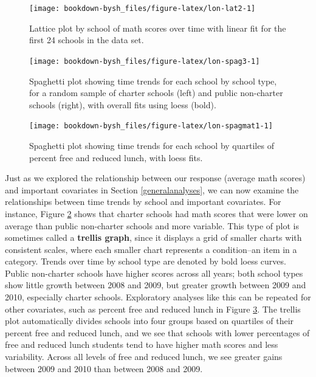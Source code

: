 \documentclass[
]{krantz}
\begin{document}
\begin{figure}

{\centering \texttt{[image: bookdown-bysh\_files/figure-latex/lon-lat2-1]} 

}

\caption{ Lattice plot by school of math scores over time with linear fit for the first 24 schools in the data set.}\label{fig:lon-lat2}
\end{figure}

\begin{figure}

{\centering \texttt{[image: bookdown-bysh\_files/figure-latex/lon-spag3-1]} 

}

\caption{Spaghetti plot showing time trends for each school by school type, for a random sample of charter schools (left) and public non-charter schools (right), with overall fits using loess (bold).}\label{fig:lon-spag3}
\end{figure}

\begin{figure}

{\centering \texttt{[image: bookdown-bysh\_files/figure-latex/lon-spagmat1-1]} 

}

\caption{Spaghetti plot showing time trends for each school by quartiles of percent free and reduced lunch, with loess fits.}\label{fig:lon-spagmat1}
\end{figure}

Just as we explored the relationship between our response (average math scores) and important covariates in Section \ref{generalanalyses}, we can now examine the relationships between time trends by school and important covariates. For instance, Figure \ref{fig:lon-spag3} shows that charter schools had math scores that were lower on average than public non-charter schools and more variable. This type of plot is sometimes called a \textbf{trellis graph}, since it displays a grid of smaller charts with consistent scales, where each smaller chart represents a condition--an item in a category. Trends over time by school type are denoted by bold loess curves. Public non-charter schools have higher scores across all years; both school types show little growth between 2008 and 2009, but greater growth between 2009 and 2010, especially charter schools. Exploratory analyses like this can be repeated for other covariates, such as percent free and reduced lunch in Figure \ref{fig:lon-spagmat1}. The trellis plot automatically divides schools into four groups based on quartiles of their percent free and reduced lunch, and we see that schools with lower percentages of free and reduced lunch students tend to have higher math scores and less variability. Across all levels of free and reduced lunch, we see greater gains between 2009 and 2010 than between 2008 and 2009.
\end{document}
